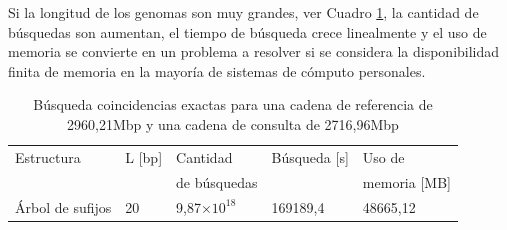\documentclass[12pt,a4paper]{article}
\providecommand{\e}[1]{\ensuremath{\times 10^{#1}}}
\begin{document}
Si la longitud de los genomas son muy grandes, ver Cuadro \ref{tab:buscar3}, 
la cantidad de búsquedas son aumentan, el tiempo de búsqueda
crece linealmente y el uso de memoria se convierte en un problema a resolver si
se considera la disponibilidad finita de memoria en la mayoría de sistemas de
cómputo personales.\\
\begin{table}[ h!]
  \begin{small}
    \begin{center}
      \begin{tabular}{lllll}
        Estructura & L [bp] & Cantidad  & Búsqueda [s] & Uso de\\
        & & de búsquedas & & memoria [MB]\\
        \hline
        Árbol de sufijos & 20 & 9,87\e{18}  & 169189,4 & 48665,12\\
        \hline
      \end{tabular}
    \end{center}
  \end{small}
  \caption{Búsqueda coincidencias exactas para una cadena de referencia de 
  2960,21Mbp y una cadena de consulta de 2716,96Mbp}
  \label{tab:buscar3}
\end{table}
\end{document}
